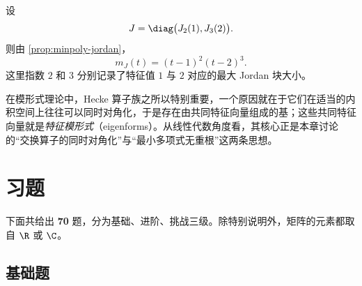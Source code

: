 \begin{example}
设
\[
J=\diag\bigl(J_2(1),J_3(2)\bigr).
\]
则由 \cref{prop:minpoly-jordan}，
\[
m_J(t)=(t-1)^2(t-2)^3.
\]
这里指数 \(2\) 和 \(3\) 分别记录了特征值 \(1\) 与 \(2\) 对应的最大 Jordan 块大小。
\end{example}

\begin{remark}
在模形式理论中，Hecke 算子族之所以特别重要，一个原因就在于它们在适当的内积空间上往往可以同时对角化，于是存在由共同特征向量组成的基；这些共同特征向量就是\emph{特征模形式}（eigenforms）。从线性代数角度看，其核心正是本章讨论的“交换算子的同时对角化”与“最小多项式无重根”这两条思想。
\end{remark}

\section*{习题}

下面共给出 \textbf{70} 题，分为基础、进阶、挑战三级。除特别说明外，矩阵的元素都取自 \(\R\) 或 \(\C\)。

\subsection*{基础题}

